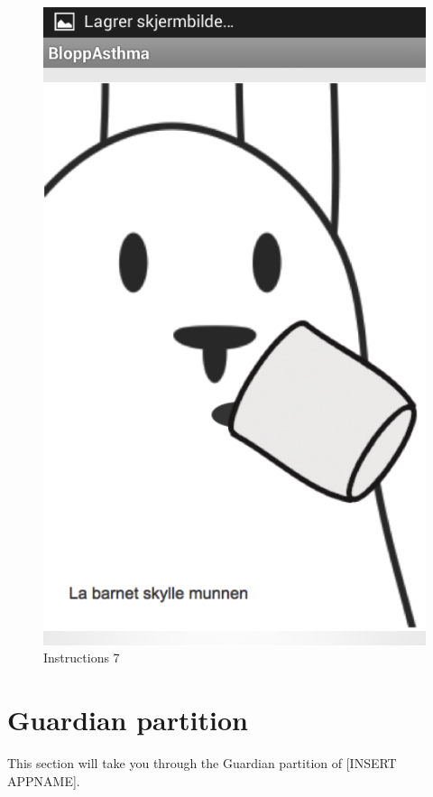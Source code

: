 \begin{figure}
	\begin{minipage}[b]{0.3\linewidth}
		\centering
		\includegraphics[width=0.20\paperwidth]{Pictures/app-screenshots/instructions-7.png}
		\caption{Instructions 7}
		\label{fig:instructions-7}
	\end{minipage}
\end{figure}





\section{Guardian partition}
This section will take you through the Guardian partition of [INSERT APPNAME].

